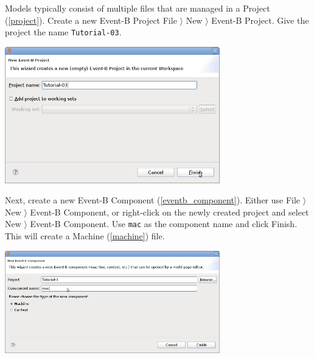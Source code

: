 Models typically consist of multiple files that are managed in a Project (\ref{project}).  Create a new Event-B Project \textsf{File $\rangle$ New $\rangle$ Event-B Project}.  Give the project the name \texttt{Tutorial-03}.
\begin{center}
	\includegraphics[width=0.7\textwidth]{img/tutorial/tut_3_tutorial-3.png}
\end{center}


Next, create a new Event-B Component (\ref{eventb_component}).  Either use \textsf{File $\rangle$ New $\rangle$ Event-B Component}, or right-click on the newly created project and select \textsf{New $\rangle$ Event-B Component}.  Use \texttt{mac} as the component name and click \textsf{Finish}.  This will create a Machine (\ref{machine}) file.

\begin{center}
	\includegraphics[width=0.7\textwidth]{img/tutorial/tut_3_mac.png}
\end{center}

